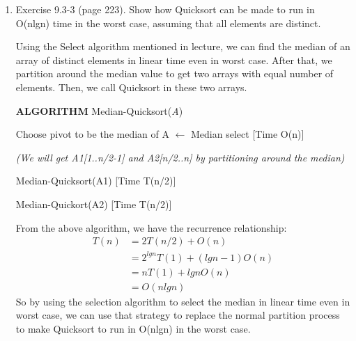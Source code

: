 \documentclass[11pts]{report}
\begin{document}
\begin{enumerate}
\item Exercise 9.3-3 (page 223). Show how Quicksort can be made to run in O(nlgn) time in the worst case, assuming that all elements are distinct.

Using the Select algorithm mentioned in lecture, we can find the median of an array of distinct elements in linear time even in worst case. After that, we partition around the median value to get two arrays with equal number of elements. Then, we call Quicksort in these two arrays.

\par \textbf{ALGORITHM} Median-Quicksort(\textit{A})
\par Choose pivot to be the median of A $\gets$ Median select [Time O(n)]
\par \textit{(We will get A1[1..n/2-1] and A2[n/2..n] by partitioning around the median)}
\par \qquad Median-Quicksort(A1) [Time T(n/2)]
\par \qquad Median-Quickort(A2)  [Time T(n/2)]
\par
\par From the above algorithm, we have the recurrence relationship:
\begin{align*}
T(n) &= 2T(n/2) + O(n) \\
	 &= 2^{lgn}T(1) + (lgn - 1)O(n) \\
	 &= nT(1) + lgnO(n) \\
	 &= O(nlgn)
\end{align*}
So by using the selection algorithm to select the median in linear time even in worst case, we can use that strategy to replace the normal partition process to make Quicksort to run in O(nlgn) in the worst case.

\end{enumerate}
\end{document}
